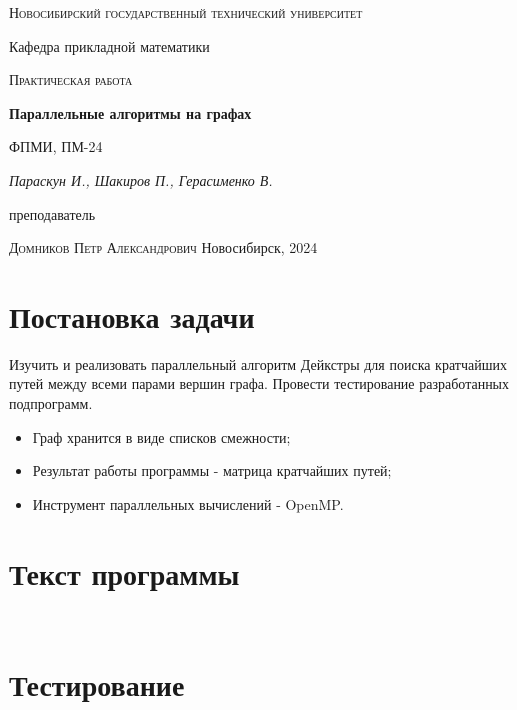 \documentclass[12pt, a4paper]{article}
\begin{document}
\begin{titlepage}
  \centering
  \textsc{Новосибирский государственный технический университет}\par
  \vspace{1mm}
  Кафедра прикладной математики\par
  \vspace{4cm}
  \textsc{Практическая работа }\par
  {\huge\bfseries Параллельные алгоритмы на графах\par}
  \vspace{1cm}
  {\scriptsize ФПМИ, ПМ-24\par}
  \vspace{1mm}
  {\itshape\large Параскун И., Шакиров П., Герасименко В.\par}
  \vfill
  {\small преподаватель\par}
  \vspace{1mm}
  \textsc{Домников Петр Александрович}
  \vfill
  \large{Новосибирск, 2024}
\end{titlepage}


\setcounter{page}{2}
\tableofcontents

\newpage

\section{Постановка задачи}
Изучить и реализовать параллельный алгоритм Дейкстры для поиска кратчайших путей между всеми парами вершин графа.
Провести тестирование разработанных подпрограмм.

\begin{itemize}
  \item Граф хранится в виде списков смежности;
  \item Результат работы программы - матрица кратчайших путей;
  \item Инструмент параллельных вычислений - OpenMP.
\end{itemize}

\section{Текст программы}

\inputminted[firstline=6, lastline=26]{c}{/home/mehandes/c/src/github.com/paraskun/math/bgs/dcg/include/bgs/dcg.h}
\inputminted[firstline=11]{c}{/home/mehandes/c/src/github.com/paraskun/math/bgs/dcg/src/dcg.c}

\section{Тестирование}
\end{document}
